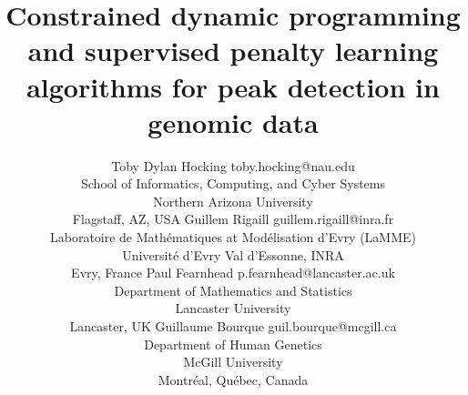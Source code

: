 \documentclass[twoside,11pt]{article}
\begin{document}
\title{Constrained dynamic programming and supervised
penalty learning algorithms for 
peak detection in genomic data}

\author{
  \name Toby Dylan Hocking \email toby.hocking@nau.edu \\
  \addr School of Informatics, Computing, and Cyber Systems\\
  Northern Arizona University\\
  Flagstaff, AZ, USA
  \AND
  \name Guillem Rigaill \email guillem.rigaill@inra.fr \\
  \addr Laboratoire de Math\'ematiques at Mod\'elisation d'Evry (LaMME)\\
  Universit\'e d'Evry Val d'Essonne, INRA\\
  Evry, France
  \AND
  \name Paul Fearnhead \email p.fearnhead@lancaster.ac.uk \\
  \addr Department of Mathematics and Statistics\\
  Lancaster University\\
  Lancaster, UK
  \AND
  \name Guillaume Bourque \email guil.bourque@mcgill.ca\\
  \addr Department of Human Genetics\\
  McGill University\\
  Montr\'eal, Qu\'ebec, Canada}


\maketitle
\end{document}
